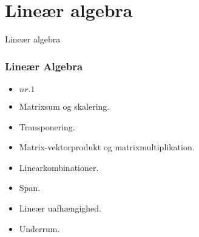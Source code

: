 \section{Lineær algebra}
\begin{frame}
\centering
\Huge
Lineær algebra
\end{frame}
%
\begin{frame}
\frametitle{Lineær Algebra}
\begin{itemize}
\item \textbf{$nr. 1$}
\item Matrixsum og skalering.
\item Transponering.
\item Matrix-vektorprodukt og matrixmultiplikation.
\item Linearkombinationer.
\item Span.
\item Lineær uafhængighed.
\item Underrum.
\end{itemize}
\end{frame}
